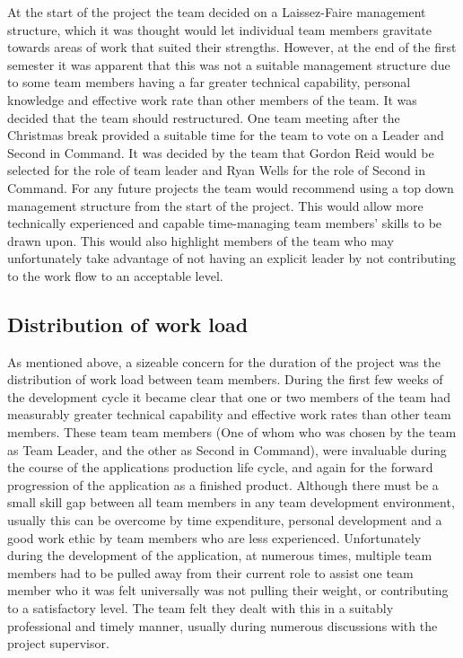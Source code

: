 At the start of the project the team decided on a Laissez-Faire management 
structure, which it was thought would let individual team members gravitate 
towards areas of work that suited their strengths. However, at the end of the 
first semester it was apparent that this was not a suitable management 
structure due to some team members having a far greater technical capability, 
personal knowledge and effective work rate than other members of the team. It 
was decided that the team should restructured. One team meeting after the 
Christmas break provided a suitable time for the team to vote on a Leader and 
Second in Command. It was decided by the team that Gordon Reid would be 
selected for the role of team leader and Ryan Wells for the role of Second in 
Command. For any future projects the team would recommend using a top down 
management structure from the start of the project. This would allow more 
technically experienced and capable time-managing team members' skills to be 
drawn upon. This would also highlight members of the team who may 
unfortunately take advantage of not having an explicit leader by not 
contributing to the work flow to an acceptable level.           

\subsection{Distribution of work load}

As mentioned above, a sizeable concern for the duration of the project was the 
distribution of work load between team members. During the first few weeks of 
the development cycle it became clear that one or two members of the team had 
measurably greater technical capability and effective work rates than other 
team members. These team team members (One of whom who was chosen by the team 
as Team Leader, and the other as Second in Command), were invaluable during 
the course of the applications production life cycle, and again for the 
forward progression of the application as a finished product. Although there 
must be a small skill gap between all team members in any team development 
environment, usually this can be overcome by time expenditure, personal 
development and a good work ethic by team members who are less experienced. 
Unfortunately during the development of the application, at numerous times, 
multiple team members had to be pulled away from their current role to assist 
one team member who it was felt universally was not pulling their weight, or 
contributing to a satisfactory level. The team felt they dealt with this in a 
suitably professional and timely manner, usually during numerous discussions 
with the project supervisor.           

